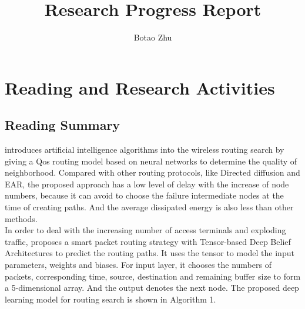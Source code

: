 \documentclass[11pt]{report}
\title{Research Progress Report}
\author{Botao Zhu}
\begin{document}
	
	\maketitle
	 \chead{} 
	 \cfoot{} 
	\renewcommand{\footrulewidth}{1.0pt}
	\renewcommand{\headrulewidth}{2.0pt}
	\renewcommand{\arraystretch}{1.3}
	\pagestyle{fancy}
	
	\renewcommand{\thesection}{\arabic{section}}
	
	\section{Reading and Research Activities}
	

	\subsection{Reading Summary}
	\noindent\cite{Barbancho2007} introduces artificial intelligence algorithms into the wireless routing search by giving a Qos routing model based on neural networks to determine the quality of neighborhood. Compared with other routing protocols, like Directed diffusion and EAR, the proposed approach has a low level of delay with the increase of node numbers, because it can avoid to choose the failure intermediate nodes at the time of creating paths. And the average dissipated energy is also less than other methods.\\
	
	\noindent In order to deal with the increasing number of access terminals and exploding traffic, \cite{8254036} proposes a smart packet routing strategy with Tensor-based Deep Belief Architectures to predict the routing paths. It uses the tensor to model the input parameters, weights and biases. For input layer, it chooses the numbers of packets, corresponding time, source, destination and remaining buffer size to form a 5-dimensional array. And the output denotes the next node. The proposed deep learning model for routing search is shown in Algorithm 1.\\
	
\end{document}
